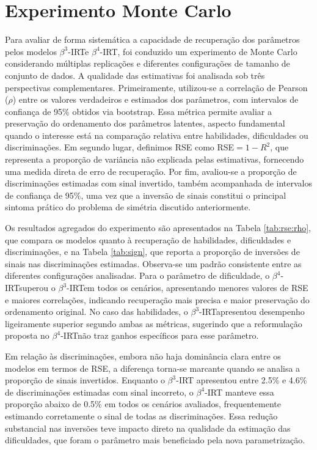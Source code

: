 \section{Experimento Monte Carlo}


Para avaliar de forma sistemática a capacidade de recuperação dos parâmetros pelos modelos $\beta^{3}$-\gls{IRT}e $\beta^{4}$-\gls{IRT}, foi conduzido um experimento de Monte Carlo considerando múltiplas replicações e diferentes configurações de tamanho de conjunto de dados. A qualidade das estimativas foi analisada sob três perspectivas complementares. Primeiramente, utilizou-se a correlação de Pearson ($\rho$) entre os valores verdadeiros e estimados dos parâmetros, com intervalos de confiança de 95\% obtidos via bootstrap. Essa métrica permite avaliar a preservação do ordenamento dos parâmetros latentes, aspecto fundamental quando o interesse está na comparação relativa entre habilidades, dificuldades ou discriminações. Em segundo lugar, definimos \gls{RSE} como \gls{RSE}$ = 1 - R^2$, que representa a proporção de variância não explicada pelas estimativas, fornecendo uma medida direta de erro de recuperação. Por fim, avaliou-se a proporção de discriminações estimadas com sinal invertido, também acompanhada de intervalos de confiança de 95\%, uma vez que a inversão de sinais constitui o principal sintoma prático do problema de simétria discutido anteriormente.





Os resultados agregados do experimento são apresentados na Tabela \ref{tab:rse:rho}, que compara os modelos quanto à recuperação de habilidades, dificuldades e discriminações, e na Tabela \ref{tab:sign}, que reporta a proporção de inversões de sinais nas discriminações estimadas. Observa-se um padrão consistente entre as diferentes configurações analisadas. Para o parâmetro de dificuldade, o $\beta^{4}$-\gls{IRT}superou o $\beta^{3}$-\gls{IRT}em todos os cenários, apresentando menores valores de RSE e maiores correlações, indicando recuperação mais precisa e maior preservação do ordenamento original. No caso das habilidades, o $\beta^{3}$-\gls{IRT}apresentou desempenho ligeiramente superior segundo ambas as métricas, sugerindo que a reformulação proposta no $\beta^{4}$-\gls{IRT}não traz ganhos específicos para esse parâmetro.




Em relação às discriminações, embora não haja dominância clara entre os modelos em termos de \gls{RSE}, a diferença torna-se marcante quando se analisa a proporção de sinais invertidos. Enquanto o $\beta^{3}$-\gls{IRT} apresentou entre 2.5\% e 4.6\% de discriminações estimadas com sinal incorreto, o $\beta^{4}$-\gls{IRT} manteve essa proporção abaixo de 0.5\% em todos os cenários avaliados, frequentemente estimando corretamente o sinal de todas as discriminações. Essa redução substancial nas inversões teve impacto direto na qualidade da estimação das dificuldades, que foram o parâmetro mais beneficiado pela nova parametrização.

